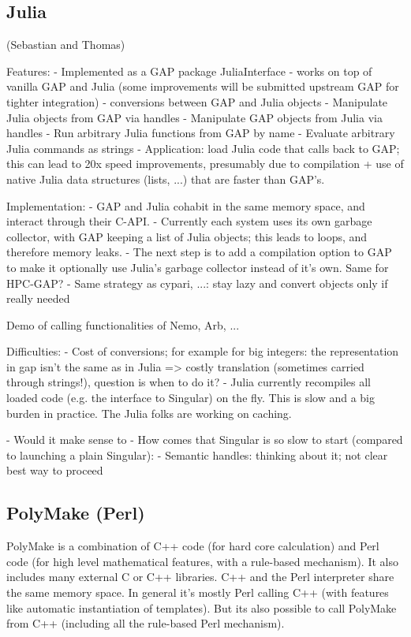 \subsection{Julia}

(Sebastian and Thomas)

Features:
- Implemented as a GAP package JuliaInterface
- works on top of vanilla GAP and Julia (some improvements will be submitted upstream GAP for tighter integration)
- conversions between GAP and Julia objects
- Manipulate Julia objects from GAP via handles
- Manipulate GAP objects from Julia via handles
- Run arbitrary Julia functions from GAP by name
- Evaluate arbitrary Julia commands as strings
- Application: load Julia code that calls back to GAP; this can lead to 20x speed improvements,
  presumably due to compilation + use of native Julia data structures (lists, ...) that are faster
  than GAP's.

Implementation:
- GAP and Julia cohabit in the same memory space, and interact through their C-API.
- Currently each system uses its own garbage collector, with GAP keeping a list
  of Julia objects; this leads to loops, and therefore memory leaks.
- The next step is to add a compilation option to GAP to make it optionally use
  Julia's garbage collector instead of it's own. Same for HPC-GAP?
- Same strategy as cypari, ...: stay lazy and convert objects only if really needed

Demo of calling functionalities of Nemo, Arb, ...

Difficulties:
- Cost of conversions; for example for big integers: the representation in gap isn't the same as in Julia => costly translation (sometimes carried through strings!), question is when to do it?
- Julia currently recompiles all loaded code (e.g. the interface to Singular) on the fly. This is slow and a big
  burden in practice. The Julia folks are working on caching.

- Would it make sense to 
- How comes that Singular is so slow to start (compared to launching a plain Singular):
- Semantic handles: thinking about it; not clear best way to proceed

\subsection{PolyMake (Perl)}

PolyMake is a combination of C++ code (for hard core calculation) and Perl code
(for high level mathematical features, with a rule-based mechanism).
It also includes many external C or C++ libraries.
C++ and the Perl interpreter share the same memory space. In general it's mostly Perl
calling C++ (with features like automatic instantiation of templates). But its also possible
to call PolyMake from C++ (including all the rule-based Perl mechanism).

